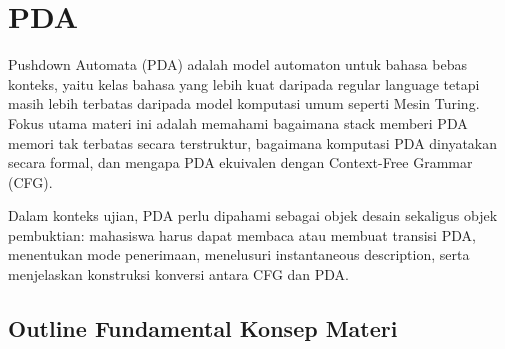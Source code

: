 \section{PDA}

Pushdown Automata (PDA) adalah model automaton untuk bahasa bebas konteks, yaitu kelas bahasa yang lebih kuat daripada regular language tetapi masih lebih terbatas daripada model komputasi umum seperti Mesin Turing. Fokus utama materi ini adalah memahami bagaimana stack memberi PDA memori tak terbatas secara terstruktur, bagaimana komputasi PDA dinyatakan secara formal, dan mengapa PDA ekuivalen dengan Context-Free Grammar (CFG).

Dalam konteks ujian, PDA perlu dipahami sebagai objek desain sekaligus objek pembuktian: mahasiswa harus dapat membaca atau membuat transisi PDA, menentukan mode penerimaan, menelusuri instantaneous description, serta menjelaskan konstruksi konversi antara CFG dan PDA.

\subsection{Outline Fundamental Konsep Materi}

